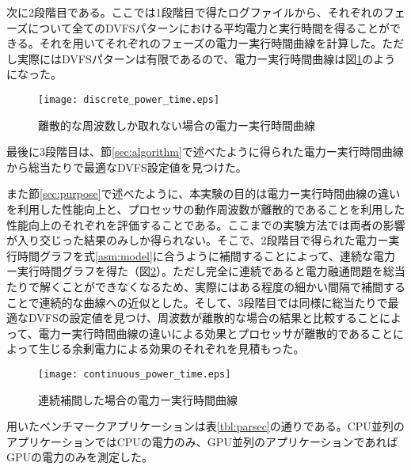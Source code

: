 次に2段階目である。ここでは1段階目で得たログファイルから、それぞれのフェーズについて全てのDVFSパターンにおける平均電力と実行時間を得ることができる。それを用いてそれぞれのフェーズの電力ー実行時間曲線を計算した。ただし実際にはDVFSパターンは有限であるので、電力ー実行時間曲線は図\ref{fig:discrete_power_time}のようになった。

\begin{figure}[t]
 \begin{center}
  \texttt{[image: discrete\_power\_time.eps]}
 \end{center}
 \caption{離散的な周波数しか取れない場合の電力ー実行時間曲線}
 \label{fig:discrete_power_time}
\end{figure}

最後に3段階目は、節\ref{sec:algorithm}で述べたように得られた電力ー実行時間曲線から総当たりで最適なDVFS設定値を見つけた。

また節\ref{sec:purpose}で述べたように、本実験の目的は電力ー実行時間曲線の違いを利用した性能向上と、プロセッサの動作周波数が離散的であることを利用した性能向上のそれぞれを評価することである。ここまでの実験方法では両者の影響が入り交じった結果のみしか得られない。そこで、2段階目で得られた電力ー実行時間グラフを式\ref{asm:model}に合うように補間することによって、連続な電力ー実行時間グラフを得た（図\ref{fig:continuous_power_time}）。ただし完全に連続であると電力融通問題を総当たりで解くことができなくなるため、実際にはある程度の細かい間隔で補間することで連続的な曲線への近似とした。そして、3段階目では同様に総当たりで最適なDVFSの設定値を見つけ、周波数が離散的な場合の結果と比較することによって、電力ー実行時間曲線の違いによる効果とプロセッサが離散的であることによって生じる余剰電力による効果のそれぞれを見積もった。

\begin{figure}[t]
 \begin{center}
  \texttt{[image: continuous\_power\_time.eps]}
 \end{center}
 \caption{連続補間した場合の電力ー実行時間曲線}
 \label{fig:continuous_power_time}
\end{figure}

用いたベンチマークアプリケーションは表\ref{tbl:parsec}の通りである。CPU並列のアプリケーションではCPUの電力のみ、GPU並列のアプリケーションであればGPUの電力のみを測定した。

